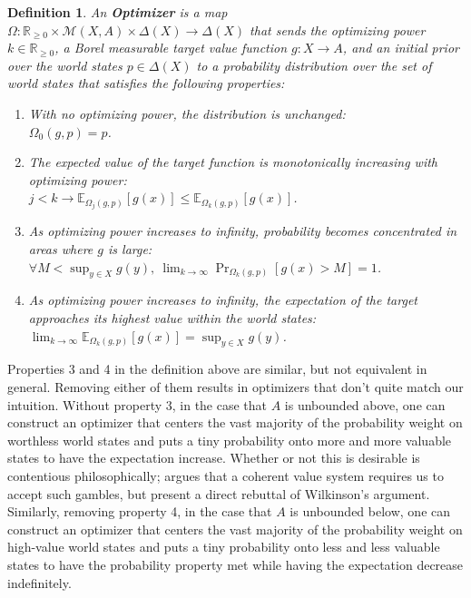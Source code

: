 \documentclass{article}
\newtheorem{Definition}{Definition}[section] \crefname{Definition}{Definition}{Definitions}
\begin{document}
\begin{Definition}\label{def:optimizer}
An \textbf{Optimizer} is a map $\Omega : \mathbb R_{\geq 0} \times \mathcal M(X,A) \times \Delta(X) \rightarrow \Delta(X)$ that sends the optimizing power $k \in \mathbb R_{\geq 0}$, a Borel measurable target value function $g : X \rightarrow A$, and an initial prior over the world states $p \in \Delta(X)$ to a probability distribution over the set of world states that satisfies the following properties:
\begin{enumerate}
    \item With no optimizing power, the distribution is unchanged: \\
    $\Omega_0(g,p) = p$.
    \item The expected value of the target function is monotonically increasing with optimizing power: \\
    $j < k \rightarrow \mathbb E_{\Omega_{j}(g,p)}[g(x)] \leq \mathbb E_{\Omega_{k}(g,p)}[g(x)]$.
    \item As optimizing power increases to infinity, probability becomes concentrated in areas where $g$ is large:\\
    $\forall M < \sup_{y \in X} g(y), \ \lim_{k \rightarrow \infty} \Pr_{\Omega_k(g,p)}[g(x) > M] = 1$.
    \item As optimizing power increases to infinity, the expectation of the target approaches its highest value within the world states:\\
    $\lim_{k \rightarrow \infty} \mathbb E_{\Omega_k(g,p)}[g(x)] = \sup_{y \in X} g(y)$.
\end{enumerate}
\end{Definition}

Properties 3 and 4 in the definition above are similar, but not equivalent in general. Removing either of them results in optimizers that don't quite match our intuition. Without property 3, in the case that $A$ is unbounded above, one can construct an optimizer that centers the vast majority of the probability weight on worthless world states and puts a tiny probability onto more and more valuable states to have the expectation increase. Whether or not this is desirable is contentious philosophically; \citet{wilkinson2022defense} argues that a coherent value system requires us to accept such gambles, but \citet{bottomley2025offense} present a direct rebuttal of Wilkinson's argument. Similarly, removing property 4, in the case that $A$ is unbounded below, one can construct an optimizer that centers the vast majority of the probability weight on high-value world states and puts a tiny probability onto less and less valuable states to have the probability property met while having the expectation decrease indefinitely.\\ 
\end{document}
